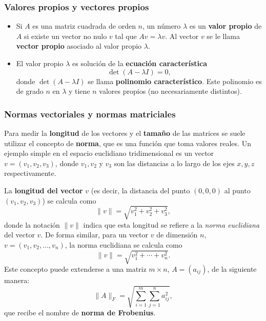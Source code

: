 \documentclass[12pt]{article}
\begin{document}
\subsubsection{Valores propios y vectores propios}

\begin{itemize}
\item Si $A$ es una matriz cuadrada de orden $n$, un número $\lambda$ es un \textbf{valor propio} de $A$ si existe un vector no nulo $v$ tal que $Av = \lambda v$. Al vector $v$ se le llama \textbf{vector propio} asociado al valor propio $\lambda$.

\item El valor propio $\lambda$ es solución de la \textbf{ecuación característica} $$\det(A - \lambda I) = 0,$$ donde $\det(A - \lambda I)$ se llama \textbf{polinomio característico}.  Este polinomio es de grado $n$ en $\lambda$  y tiene $n$ valores propios (no necesariamente distintos).
\end{itemize}

\subsubsection{Normas vectoriales y normas matriciales}
Para medir la \textbf{longitud} de los vectores y el \textbf{tamaño} de las matrices se suele utilizar el concepto de \textbf{norma}, que es una función que toma valores reales. Un ejemplo simple en el espacio euclidiano tridimensional es un vector $v = (v_1, v_2, v_3)$, donde $v_1, v_2$ y $v_3$ son las distancias a lo largo de los ejes $x, y, z$ respectivamente.  \bigskip

La \textbf{longitud del vector} $v$ (es decir, la distancia del punto $(0,0,0)$ al punto $(v_1, v_2, v_3)$) se calcula como $$\|v\| = \sqrt{v_1^2 + v_2^2 + v_3^2},$$
donde la notación $\|v\|$ indica que esta longitud se refiere a la \textit{norma euclidiana} del vector $v$.   De forma similar, para un vector $v$ de dimensión $n$, $v = (v_1, v_2, \ldots, v_n)$, la norma euclidiana se calcula como $$\|v\| = \sqrt{v_1^2 + \cdots + v_n^2}.$$ Este concepto puede extenderse a una matriz $ m \times n $, $ A = (a_{ij}) $, de la siguiente manera: $$\|A\|_F = \sqrt{ \sum_{i=1}^m \sum_{j=1}^n a_{ij}^2 },$$
que recibe el nombre de \textbf{norma de Frobenius}.
\end{document}
